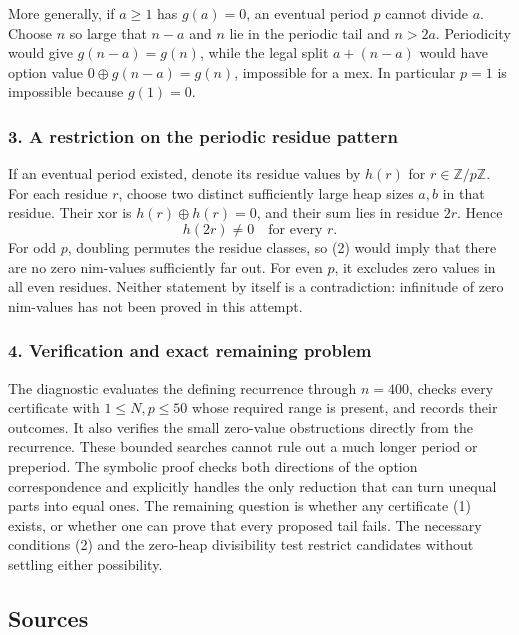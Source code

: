 \documentclass[11pt,a4paper]{article}
\begin{document}
More generally, if $a\geq1$ has $g(a)=0$, an eventual period $p$ cannot divide $a$. Choose $n$ so large that $n-a$ and $n$ lie in the periodic tail and $n>2a$. Periodicity would give $g(n-a)=g(n)$, while the legal split $a+(n-a)$ would have option value $0\oplus g(n-a)=g(n)$, impossible for a mex. In particular $p=1$ is impossible because $g(1)=0$.

\subsubsection{3. A restriction on the periodic residue pattern}
If an eventual period existed, denote its residue values by $h(r)$ for $r\in\mathbb Z/p\mathbb Z$. For each residue $r$, choose two distinct sufficiently large heap sizes $a,b$ in that residue. Their xor is $h(r)\oplus h(r)=0$, and their sum lies in residue $2r$. Hence
\[h(2r)\ne0\quad\text{for every }r.\tag{2}\]
For odd $p$, doubling permutes the residue classes, so (2) would imply that there are no zero nim-values sufficiently far out. For even $p$, it excludes zero values in all even residues. Neither statement by itself is a contradiction: infinitude of zero nim-values has not been proved in this attempt.

\subsubsection{4. Verification and exact remaining problem}
The diagnostic evaluates the defining recurrence through $n=400$, checks every certificate with $1\leq N,p\leq50$ whose required range is present, and records their outcomes. It also verifies the small zero-value obstructions directly from the recurrence. These bounded searches cannot rule out a much longer period or preperiod. The symbolic proof checks both directions of the option correspondence and explicitly handles the only reduction that can turn unequal parts into equal ones. The remaining question is whether any certificate (1) exists, or whether one can prove that every proposed tail fails. The necessary conditions (2) and the zero-heap divisibility test restrict candidates without settling either possibility.

\subsection{Sources}
\end{document}
